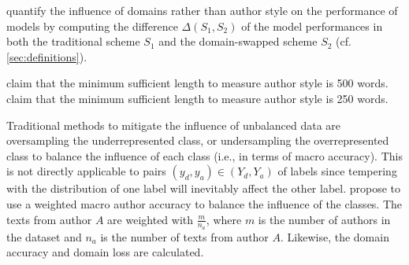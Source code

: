 \citet{bischoff_importance_2020} quantify the influence of domains rather than author style on the performance of models by 
computing the difference $\Delta(S_1,S_2)$ of the model performances in both the traditional scheme $S_1$ 
and the domain-swapped scheme $S_2$ (cf. \autoref{sec:definitions}).

\citet{bischoff_importance_2020} claim that the minimum sufficient length to measure author style is 500 words.
\citet{abbasi_writeprints_2008} claim that the minimum sufficient length to measure author style is 250 words.

Traditional methods to mitigate the influence of unbalanced data are oversampling the underrepresented class, 
or undersampling the overrepresented class to balance the influence of each class (i.e., in terms of macro accuracy).
This is not directly applicable to pairs $(y_d, y_a) \in (Y_d, Y_a)$ of labels since tempering with the distribution 
of one label will inevitably affect the other label.
\citet{bischoff_importance_2020} propose to use a weighted macro author accuracy to balance the influence of the classes.
The texts from author $A$ are weighted with $\frac{m}{n_a}$, 
where $m$ is the number of authors in the dataset and $n_a$ is the number of texts from author $A$.
Likewise, the domain accuracy and domain loss are calculated.